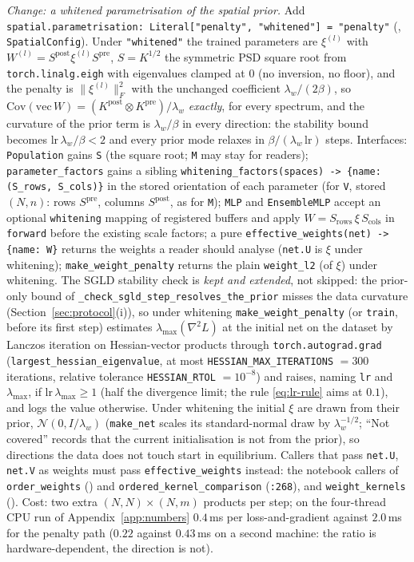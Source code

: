 \documentclass[11pt,a4paper]{article}
\newcommand{\code}[1]{\texttt{#1}}
\begin{document}
\emph{Change: a whitened parametrisation of the spatial prior.} Add \code{spatial.parametrisation: Literal["penalty", "whitened"] = "penalty"} (, \code{SpatialConfig}). Under \code{"whitened"} the trained parameters are $\xi^{(l)}$ with $W^{(l)} = S^{\mathrm{post}}\xi^{(l)}S^{\mathrm{pre}}$, $S = K^{1/2}$ the symmetric PSD square root from \code{torch.linalg.eigh} with eigenvalues clamped at $0$ (no inversion, no floor), and the penalty is $\|\xi^{(l)}\|_F^2$ with the unchanged coefficient $\lambda_w/(2\beta)$, so $\mathrm{Cov}(\mathrm{vec}\,W) = (K^{\mathrm{post}}\otimes K^{\mathrm{pre}})/\lambda_w$ \emph{exactly}, for every spectrum, and the curvature of the prior term is $\lambda_w/\beta$ in every direction: the stability bound becomes $\mathrm{lr}\,\lambda_w/\beta < 2$ and every prior mode relaxes in $\beta/(\lambda_w\,\mathrm{lr})$ steps. Interfaces: \code{Population} gains \code{S} (the square root; \code{M} may stay for readers); \code{parameter\_factors} gains a sibling \code{whitening\_factors(spaces) -> \{name: (S\_rows, S\_cols)\}} in the stored orientation of each parameter (for \code{V}, stored $(N, n)$: rows $S^{\mathrm{pre}}$, columns $S^{\mathrm{post}}$, as for \code{M}); \code{MLP} and \code{EnsembleMLP} accept an optional \code{whitening} mapping of registered buffers and apply $W = S_{\mathrm{rows}}\,\xi\,S_{\mathrm{cols}}$ in \code{forward} before the existing scale factors; a pure \code{effective\_weights(net) -> \{name: W\}} returns the weights a reader should analyse (\code{net.U} is $\xi$ under whitening); \code{make\_weight\_penalty} returns the plain \code{weight\_l2} (of $\xi$) under whitening. The SGLD stability check is \emph{kept and extended}, not skipped: the prior-only bound of \code{\_check\_sgld\_step\_resolves\_the\_prior} misses the data curvature (Section~\ref{sec:protocol}(i)), so under whitening \code{make\_weight\_penalty} (or \code{train}, before its first step) estimates $\lambda_{\max}(\nabla^2L)$ at the initial net on the dataset by Lanczos iteration on Hessian-vector products through \code{torch.autograd.grad} (\code{largest\_hessian\_eigenvalue}, at most \code{HESSIAN\_MAX\_ITERATIONS} $= 300$ iterations, relative tolerance \code{HESSIAN\_RTOL} $= 10^{-8}$) and raises, naming \code{lr} and $\lambda_{\max}$, if $\mathrm{lr}\,\lambda_{\max}\ge1$ (half the divergence limit; the rule \eqref{eq:lr-rule} aims at $0.1$), and logs the value otherwise. Under whitening the initial $\xi$ are drawn from their prior, $\mathcal N(0, I/\lambda_w)$ (\code{make\_net} scales its standard-normal draw by $\lambda_w^{-1/2}$;  ``Not covered'' records that the current initialisation is not from the prior), so directions the data does not touch start in equilibrium. Callers that pass \code{net.U}, \code{net.V} as weights must pass \code{effective\_weights} instead: the notebook callers of \code{order\_weights} () and \code{ordered\_kernel\_comparison} (\code{:268}), and \code{weight\_kernels} (). Cost: two extra $(N,N)\times(N,m)$ products per step; on the four-thread CPU run of Appendix~\ref{app:numbers} $0.4$\,ms per loss-and-gradient against $2.0$\,ms for the penalty path ($0.22$ against $0.43$\,ms on a second machine: the ratio is hardware-dependent, the direction is not).
\end{document}
